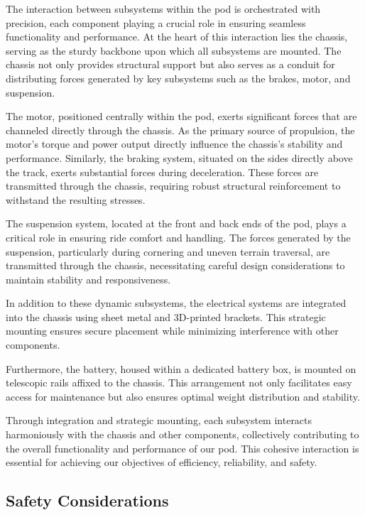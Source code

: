 The interaction between subsystems within the pod is orchestrated with precision, each component playing a crucial role in ensuring seamless functionality and performance. At the heart of this interaction lies the chassis, serving as the sturdy backbone upon which all subsystems are mounted. The chassis not only provides structural support but also serves as a conduit for distributing forces generated by key subsystems such as the brakes, motor, and suspension.

The motor, positioned centrally within the pod, exerts significant forces that are channeled directly through the chassis. As the primary source of propulsion, the motor's torque and power output directly influence the chassis's stability and performance. Similarly, the braking system, situated on the sides directly above the track, exerts substantial forces during deceleration. These forces are transmitted through the chassis, requiring robust structural reinforcement to withstand the resulting stresses.

The suspension system, located at the front and back ends of the pod, plays a critical role in ensuring ride comfort and handling. The forces generated by the suspension, particularly during cornering and uneven terrain traversal, are transmitted through the chassis, necessitating careful design considerations to maintain stability and responsiveness.

In addition to these dynamic subsystems, the electrical systems are integrated into the chassis using sheet metal and 3D-printed brackets. This strategic mounting ensures secure placement while minimizing interference with other components.

Furthermore, the battery, housed within a dedicated battery box, is mounted on telescopic rails affixed to the chassis. This arrangement not only facilitates easy access for maintenance but also ensures optimal weight distribution and stability.

Through integration and strategic mounting, each subsystem interacts harmoniously with the chassis and other components, collectively contributing to the overall functionality and performance of our pod. This cohesive interaction is essential for achieving our objectives of efficiency, reliability, and safety.




\subsection{Safety Considerations}


